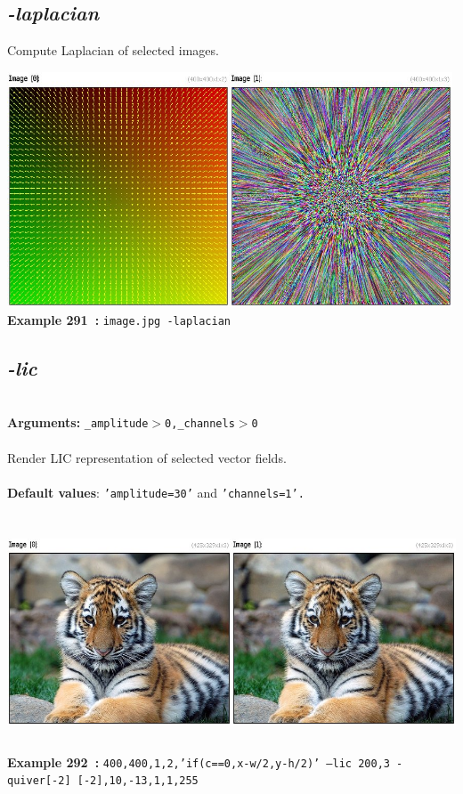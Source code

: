 \documentclass[a4paper,11pt,twoside]{book}
\begin{document}
\subsection{\emph{-laplacian} }\vspace*{-0.5em}
Compute Laplacian of selected images.
\begin{center}\includegraphics[keepaspectratio=true,height=7cm,width=\textwidth]{img/gmic_def291.jpg}\\
{\footnotesize \textbf{Example 291~:} \texttt{image.jpg -laplacian}}
\end{center}

\subsection{\emph{-lic} }\vspace*{-0.5em}
~\\\textbf{Arguments: } 
{\small \texttt{\_amplitude$>$0,\_channels$>$0}}\\~\\
Render LIC representation of selected vector fields.
~\\~\\\textbf{Default values}: {\small \texttt{'amplitude=30'} and \texttt{'channels=1'.}}
\begin{center}\includegraphics[keepaspectratio=true,height=7cm,width=\textwidth]{img/gmic_def292.jpg}\\
{\footnotesize \textbf{Example 292~:} \texttt{400,400,1,2,'if(c==0,x-w/2,y-h/2)' --lic 200,3 -quiver[-2] [-2],10,-13,1,1,255}}
\end{center}
\end{document}
